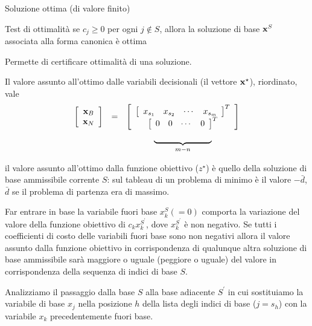 \documentclass{beamer}
\begin{document}
\begin{frame}[allowframebreaks]{Soluzione ottima (di valore finito)}
\begin{block}{ Test di ottimalit\`a}
se  $c_j \geq 0$ per ogni $j \notin S$, allora la soluzione di base $\mathbf{x}^S$ associata alla forma canonica \`e ottima
\end{block}

Permette di certificare ottimalit\`a di una soluzione.

{\small Il valore assunto all'ottimo dalle variabili decisionali (il vettore $\mathbf{x}^\star$), riordinato, vale
$$
\begin{array}{ccc}
\left[
	\begin{array}{c}
			\vecX_B\\
			\vecX_N
	\end{array}
\right]
&=&
\left[
	\begin{array}{c}
		\left[\begin{array}{cccc}x_{s_1}&x_{s_2}&\cdots&x_{s_m}\end{array}\right]^T \\
		\left[\begin{array}{cccc}0&0&\cdots&0\end{array}\right]^T
	\end{array}
\right]\\
&&\underbrace{%
		\phantom{\begin{array}{cccc}0&0&\cdots&0\end{array}}
}_{m-n}
\end{array}
$$

il valore assunto all'ottimo dalla funzione obiettivo ($z^\star$) \`e quello della soluzione di base ammissibile corrente $S$: sul tableau di un problema di minimo \`e il valore $-\bar{d}$, $\bar{d}$ se il problema di partenza era di massimo.}

\framebreak

Far entrare in base la variabile fuori base $x^S_k (=0)$  comporta la variazione del valore della funzione obiettivo di $c_k x_k^{S^\prime}$, dove $x_k^{S^\prime}$ \`e non negativo. Se tutti i coefficienti di costo delle variabili fuori base sono non negativi allora il valore assunto dalla funzione obiettivo in corrispondenza di qualunque altra soluzione di base ammissibile sar\`a maggiore o uguale (peggiore o uguale) del valore in corrispondenza della sequenza di indici di base $S$.

\framebreak

{\footnotesize
Analizziamo il passaggio dalla base $S$ alla base adiacente $S^\prime$
in cui sostituiamo la variabile di base $x_{j}$ 
nella posizione $h$ della lista degli indici di base
($j = s_h$) con la variabile $x_k$ precedentemente fuori base.}


\end{frame}
\end{document}
